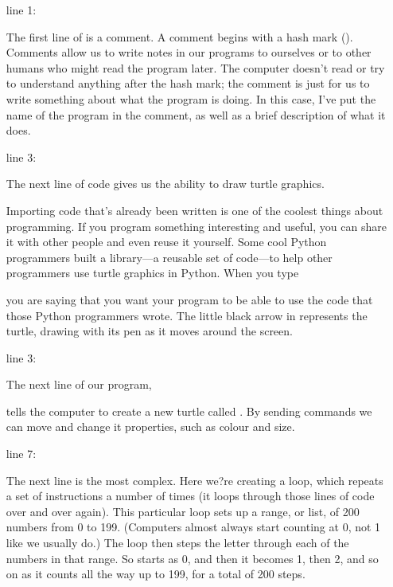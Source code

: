 \documentclass{coderdojo}
\begin{document}
\begin{itemize}

\item[{\smaller line 1:}]

The first line of  is a comment. A comment begins with a hash mark (\code{\#}). Comments allow us to write notes in our programs to ourselves or to other humans who might read the program later. The computer doesn't read or try to understand anything after the hash mark; the comment is just for us to write something about what the program is doing. In this case, I've put the name of the program in the comment, as well as a brief description of what it does.

\item[{\smaller line 3:}]

The next line of code gives us the ability to draw turtle graphics. 

Importing code that's already been written is one of the coolest things about programming. If you program something interesting and useful, you can share it with other people and even reuse it yourself. Some cool Python programmers built a library---a reusable set of code---to help other programmers use turtle graphics in Python.
When you type


you are saying that you want your program to be able to use the code that those Python programmers wrote. The little black arrow in represents the turtle, drawing with its pen as it moves around the screen.

\item[{\smaller line 3:}]

The next line of our program,


tells the computer to create a new turtle called .  By sending  commands we can move  and change it properties, such as colour and size.

\item[{\smaller line 7:}]

The next line is the most complex. Here we?re creating a  loop, which repeats a set of instructions a number of times (it loops through those lines of code over and over again). This particular loop sets up a range, or list, of 200 numbers from 0 to 199. (Computers almost always start counting at 0, not 1 like we usually do.) The loop then steps the letter  through each of the numbers in that range. So  starts as 0, and then it becomes 1, then 2, and so on as it counts all the way up to 199, for a total of 200 steps.


\end{itemize}
\end{document}
